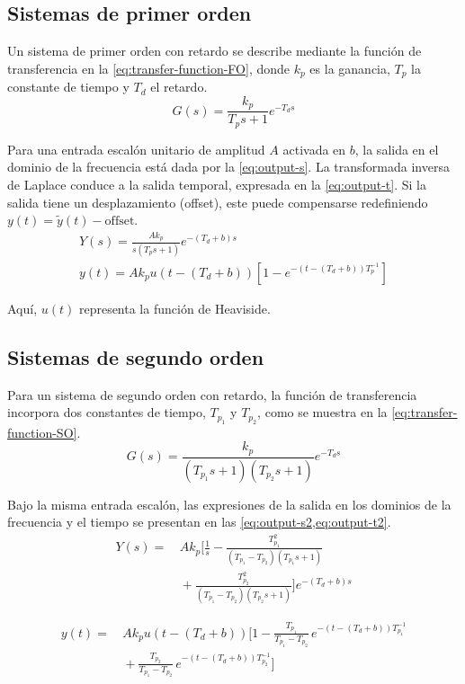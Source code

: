 \subsection{Sistemas de primer orden}

Un sistema de primer orden con retardo se describe mediante la función de
transferencia en la \cref{eq:transfer-function-FO}, donde \(k_p\) es la
ganancia, \(T_p\) la constante de tiempo y \(T_d\) el retardo.
\begin{equation}\label{eq:transfer-function-FO}
	G(s) = \frac{k_p}{T_p s + 1} e^{-T_d s}
\end{equation}

Para una entrada escalón unitario de amplitud \(A\) activada en \(b\),
la salida en el dominio de la frecuencia está dada por la
\cref{eq:output-s}. La transformada inversa de Laplace conduce a la
salida temporal, expresada en la \cref{eq:output-t}. Si la salida tiene
un desplazamiento (offset), este puede compensarse redefiniendo
\(y(t) = \tilde{y}(t) - \text{offset}\).
\begin{gather}
	Y(s) = \frac{A k_p}{s(T_p s + 1)} e^{-(T_d + b)s} \label{eq:output-s} \\
	y(t) = A k_p u(t - (T_d + b))
	\left[1 - e^{-(t - (T_d + b))T^{-1}_{p}} \right] \label{eq:output-t}
\end{gather}

Aquí, \(u(t)\) representa la función de Heaviside.

\subsection{Sistemas de segundo orden}

Para un sistema de segundo orden con retardo, la función de transferencia
incorpora dos constantes de tiempo, \(T_{p_1}\) y \(T_{p_2}\), como se
muestra en la \cref{eq:transfer-function-SO}.
\begin{equation}\label{eq:transfer-function-SO}
	G(s) = \frac{k_p}{(T_{p_1} s + 1) (T_{p_2} s + 1)} e^{-T_d s}
\end{equation}

Bajo la misma entrada escalón, las expresiones de la salida en los dominios
de la frecuencia y el tiempo se presentan en las
\cref{eq:output-s2,eq:output-t2}.
\begin{align}
	Y(s) = & \, A k_p \Bigg[\frac{1}{s}
	- \frac{T_{p_1}^2}{(T_{p_1} - T_{p_2})(T_{p_1} s + 1)} \nonumber \\
	& \, + \frac{T_{p_2}^2}{(T_{p_1} - T_{p_2})(T_{p_2} s + 1)}
	\Bigg] e^{-(T_d + b)s}
	\label{eq:output-s2}
\end{align}

\begin{align}
	y(t) = & \, A k_p u(t - (T_d + b)) \Bigg[1
	- \frac{T_{p_1}}{T_{p_1} - T_{p_2}} \, e^{-(t - (T_d + b))T^{-1}_{p_1}} \nonumber \\
	& \, + \frac{T_{p_2}}{T_{p_1} - T_{p_2}} \, e^{-(t - (T_d + b))T^{-1}_{p_2}}
	\Bigg]
	\label{eq:output-t2}
\end{align}
